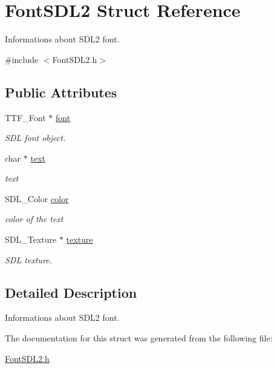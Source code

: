 \hypertarget{structFontSDL2}{}\section{Font\+S\+D\+L2 Struct Reference}
\label{structFontSDL2}


Informations about S\+D\+L2 font.  




{\ttfamily \#include $<$Font\+S\+D\+L2.\+h$>$}

\subsection*{Public Attributes}
\begin{DoxyCompactItemize}
\item 
T\+T\+F\+\_\+\+Font $\ast$ \hyperlink{structFontSDL2_a4473d0cf1fe867daeabb4106962d355e}{font}\hypertarget{structFontSDL2_a4473d0cf1fe867daeabb4106962d355e}{}\label{structFontSDL2_a4473d0cf1fe867daeabb4106962d355e}

\begin{DoxyCompactList}\small\item\em S\+DL font object. \end{DoxyCompactList}\item 
char $\ast$ \hyperlink{structFontSDL2_a2ebfe0c160217282ef912e1785894c2c}{text}\hypertarget{structFontSDL2_a2ebfe0c160217282ef912e1785894c2c}{}\label{structFontSDL2_a2ebfe0c160217282ef912e1785894c2c}

\begin{DoxyCompactList}\small\item\em text \end{DoxyCompactList}\item 
S\+D\+L\+\_\+\+Color \hyperlink{structFontSDL2_a8d430ac82b5ffff6c9e6c575328dca22}{color}\hypertarget{structFontSDL2_a8d430ac82b5ffff6c9e6c575328dca22}{}\label{structFontSDL2_a8d430ac82b5ffff6c9e6c575328dca22}

\begin{DoxyCompactList}\small\item\em color of the text \end{DoxyCompactList}\item 
S\+D\+L\+\_\+\+Texture $\ast$ \hyperlink{structFontSDL2_af8f18f11af2195bd21d120426ba89750}{texture}\hypertarget{structFontSDL2_af8f18f11af2195bd21d120426ba89750}{}\label{structFontSDL2_af8f18f11af2195bd21d120426ba89750}

\begin{DoxyCompactList}\small\item\em S\+DL texture. \end{DoxyCompactList}\end{DoxyCompactItemize}


\subsection{Detailed Description}
Informations about S\+D\+L2 font. 

The documentation for this struct was generated from the following file\+:\begin{DoxyCompactItemize}
\item 
\hyperlink{FontSDL2_8h}{Font\+S\+D\+L2.\+h}\end{DoxyCompactItemize}
